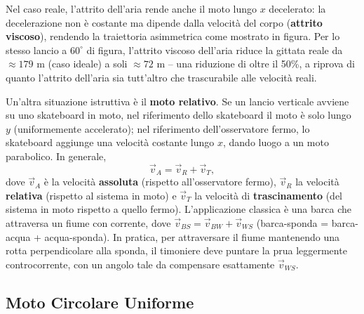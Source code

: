 \documentclass[a4paper,11pt]{article}
\begin{document}
\begin{center}
\end{center}

Nel caso reale, l'attrito dell'aria rende anche il moto lungo $x$ decelerato: la decelerazione non è costante ma dipende dalla velocità del corpo (\textbf{attrito viscoso}), rendendo la traiettoria asimmetrica come mostrato in figura. Per lo stesso lancio a $60^{\circ}$ di figura, l'attrito viscoso dell'aria riduce la gittata reale da $\approx179$ m (caso ideale) a soli $\approx72$ m -- una riduzione di oltre il 50\%, a riprova di quanto l'attrito dell'aria sia tutt'altro che trascurabile alle velocità reali.

Un'altra situazione istruttiva è il \textbf{moto relativo}. Se un lancio verticale avviene su uno skateboard in moto, nel riferimento dello skateboard il moto è solo lungo $y$ (uniformemente accelerato); nel riferimento dell'osservatore fermo, lo skateboard aggiunge una velocità costante lungo $x$, dando luogo a un moto parabolico. In generale,
\[
\vec v_A = \vec v_R + \vec v_T,
\]
dove $\vec v_A$ è la velocità \textbf{assoluta} (rispetto all'osservatore fermo), $\vec v_R$ la velocità \textbf{relativa} (rispetto al sistema in moto) e $\vec v_T$ la velocità di \textbf{trascinamento} (del sistema in moto rispetto a quello fermo). L'applicazione classica è una barca che attraversa un fiume con corrente, dove $\vec v_{BS} = \vec v_{BW} + \vec v_{WS}$ (barca-sponda = barca-acqua + acqua-sponda). In pratica, per attraversare il fiume mantenendo una rotta perpendicolare alla sponda, il timoniere deve puntare la prua leggermente controcorrente, con un angolo tale da compensare esattamente $\vec v_{WS}$.

\subsection{Moto Circolare Uniforme}
\end{document}
